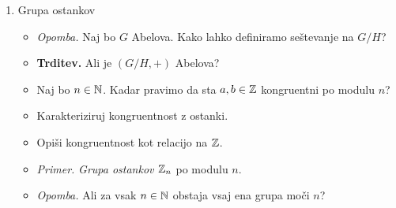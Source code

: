 \begin{enumerate}
    \item Grupa ostankov
    \begin{itemize}
        \item \colorbox{yellow!30}{\emph{Opomba.}} Naj bo $G$ Abelova. Kako lahko definiramo seštevanje na $G/H$?
        \item \colorbox{blue!30}{\textbf{Trditev.}} Ali je $(G/H, +)$ Abelova?        
        \item Naj bo $n \in \mathbb{N}$. Kadar pravimo da sta $a, b \in \mathbb{Z}$ kongruentni po modulu $n$?
        \item Karakteriziruj kongruentnost z ostanki.
        \item Opiši kongruentnost kot relacijo na $\mathbb{Z}$.
        \item \colorbox{yellow!30}{\emph{Primer.}} \emph{Grupa ostankov $\mathbb{Z}_n$} po modulu $n$.
        \item \colorbox{yellow!30}{\emph{Opomba.}} Ali za vsak $n \in \mathbb{N}$ obstaja vsaj ena grupa moči $n$?
    \end{itemize}


\end{enumerate}
